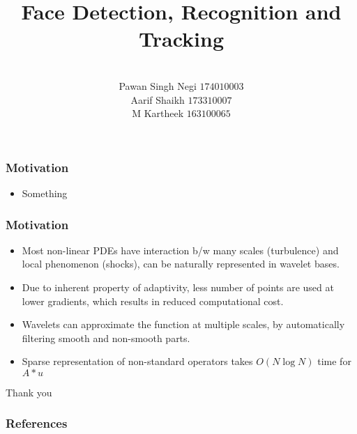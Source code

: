 \documentclass[aspectratio=149]{beamer}
\title{Face Detection, Recognition and Tracking}
\author[Pawan]{\texorpdfstring{\\}{}
    Pawan Singh Negi \- \texorpdfstring{$174010003$}{}  \texorpdfstring{\\}{}
    Aarif Shaikh \- \texorpdfstring{$173310007$}{}  \texorpdfstring{\\}{}
    M Kartheek \- \texorpdfstring{$163100065$}{}  \texorpdfstring{\\}{}
}
\institute[IITB]{Indian Institute of Technology, Bombay}
\begin{document}
\monthyeardate{}
\maketitle


\begin{frame}
    \frametitle{Motivation}
    \begin{itemize}
        \item Something
    \end{itemize}
\end{frame}



\begin{frame}
\frametitle{Motivation}
\begin{itemize}
	\item Most non-linear PDEs have interaction b/w many scales
	(turbulence) and local phenomenon (shocks), can be naturally
	represented in wavelet bases.
	\item Due to inherent property of adaptivity, less number of points are used at lower gradients, which results in reduced computational cost.
	\item Wavelets can approximate the function at multiple scales, by automatically filtering smooth and non-smooth parts.
	\item Sparse representation of non-standard operators takes
	$O(N\log N)$ time for $A*u$
\end{itemize}
\end{frame}



\begin{frame}
    \centering
    Thank you
\end{frame}

\begin{frame}[t,allowframebreaks]
  \frametitle{References}
  \printbibliography{}
\end{frame}


\end{document}
